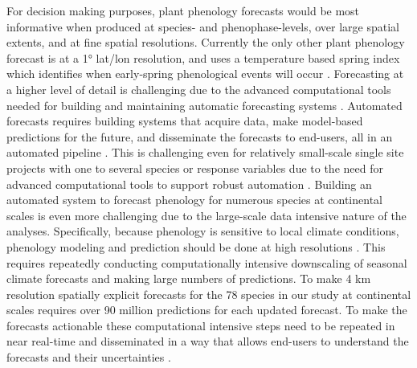 For decision making purposes, plant phenology forecasts would be most informative when produced at species- and phenophase-levels, over large spatial extents, and at fine spatial resolutions. Currently the only other plant phenology forecast is at a 1° lat/lon resolution, and uses a temperature based spring index which identifies when early-spring phenological events will occur \citep{schwartz2013, carrillo2018}. Forecasting at a higher level of detail is challenging due to the advanced computational tools needed for building and maintaining automatic forecasting systems \citep{welch2019, white2018}. Automated forecasts requires building systems that acquire data, make model-based predictions for the future, and disseminate the forecasts to end-users, all in an automated pipeline \citep{dietze2018, welch2019, white2018}. This is challenging even for relatively small-scale single site projects with one to several species or response variables due to the need for advanced computational tools to support robust automation \citep{welch2019, white2018}. Building an automated system to forecast phenology for numerous species at continental scales is even more challenging due to the large-scale data intensive nature of the analyses. Specifically, because phenology is sensitive to local climate conditions, phenology modeling and prediction should be done at high resolutions \citep{cook2010}. This requires repeatedly conducting computationally intensive downscaling of seasonal climate forecasts and making large numbers of predictions. To make 4 km resolution spatially explicit forecasts for the 78 species  in our study at continental scales requires over 90 million predictions for each updated forecast. To make the forecasts actionable these computational intensive steps need to be repeated in near real-time and disseminated in a way that allows end-users to understand the forecasts and their uncertainties \citep{dietze2018}.

